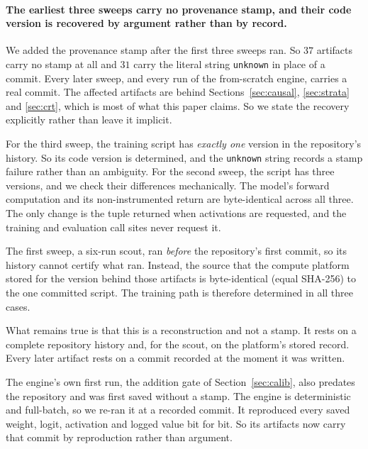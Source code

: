 \paragraph{The earliest three sweeps carry no provenance stamp, and their code version is
recovered by argument rather than by record.} We added the provenance stamp after the first
three sweeps ran. So $37$ artifacts carry no stamp at all and $31$ carry the literal string
\texttt{unknown} in place of a commit. Every later sweep, and every run of the from-scratch
engine, carries a real commit. The affected artifacts are behind
Sections~\ref{sec:causal}, \ref{sec:strata} and \ref{sec:crt}, which is most of what this
paper claims. So we state the recovery explicitly rather than leave it implicit.

For the third sweep, the training script has \emph{exactly one} version in the repository's
history. So its code version is determined, and the \texttt{unknown} string records a stamp
failure rather than an ambiguity. For the second sweep, the script has three versions, and we
check their differences mechanically. The model's forward computation and its
non-instrumented return are byte-identical across all three. The only change is the tuple
returned when activations are requested, and the training and evaluation call sites never
request it.

The first sweep, a six-run scout, ran \emph{before} the repository's first commit, so its
history cannot certify what ran. Instead, the source that the compute platform stored for the
version behind those artifacts is byte-identical (equal SHA-256) to the one committed script.
The training path is therefore determined in all three cases.

What remains true is that this is a reconstruction and not a stamp. It rests on a complete
repository history and, for the scout, on the platform's stored record. Every later artifact
rests on a commit recorded at the moment it was written.

The engine's own first run, the addition gate of Section~\ref{sec:calib}, also predates the
repository and was first saved without a stamp. The engine is deterministic and full-batch,
so we re-ran it at a recorded commit. It reproduced every saved weight, logit, activation and
logged value bit for bit. So its artifacts now carry that commit by reproduction rather than
argument.

